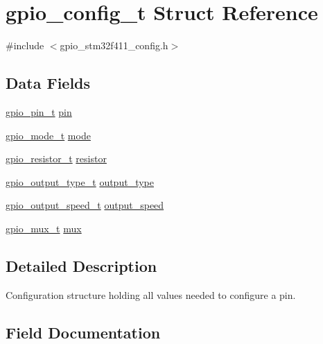 \hypertarget{structgpio__config__t}{}\section{gpio\+\_\+config\+\_\+t Struct Reference}
\label{structgpio__config__t}


{\ttfamily \#include $<$gpio\+\_\+stm32f411\+\_\+config.\+h$>$}

\subsection*{Data Fields}
\begin{DoxyCompactItemize}
\item 
\hyperlink{gpio__stm32f411__config_8h_abf6d98e99fb0fb81b56c89f29bd6120e}{gpio\+\_\+pin\+\_\+t} \hyperlink{structgpio__config__t_aa83b7f8f34af30b37ce9e23e82de5352}{pin}
\item 
\hyperlink{gpio__stm32f411__config_8h_a491a2cbfb4e94f2afcc0d5bdef2dc454}{gpio\+\_\+mode\+\_\+t} \hyperlink{structgpio__config__t_a23aeec8098631547d58a797b2ad857c1}{mode}
\item 
\hyperlink{gpio__stm32f411__config_8h_ae69599cbb4f87bfc9da21f3db8b0fe3a}{gpio\+\_\+resistor\+\_\+t} \hyperlink{structgpio__config__t_ab5a0dd08a2fc2af65242c91b9641e112}{resistor}
\item 
\hyperlink{gpio__stm32f411__config_8h_a09cae9c54cabb67e47ab4c1200b341c6}{gpio\+\_\+output\+\_\+type\+\_\+t} \hyperlink{structgpio__config__t_abebe3aee0015b70fbbbd12a796451b62}{output\+\_\+type}
\item 
\hyperlink{gpio__stm32f411__config_8h_aa8c7c905e73523d86cfed9bd45aa9495}{gpio\+\_\+output\+\_\+speed\+\_\+t} \hyperlink{structgpio__config__t_ac73298500a7a55286292448e82fcbdbf}{output\+\_\+speed}
\item 
\hyperlink{gpio__stm32f411__config_8h_ac86e130e5617ffe35f2aa1169d8a67c0}{gpio\+\_\+mux\+\_\+t} \hyperlink{structgpio__config__t_a517a0cd4125fcd45504b02d3c4a35d06}{mux}
\end{DoxyCompactItemize}


\subsection{Detailed Description}
Configuration structure holding all values needed to configure a pin. 

\subsection{Field Documentation}
\mbox{\label{structgpio__config__t_a23aeec8098631547d58a797b2ad857c1}} 

